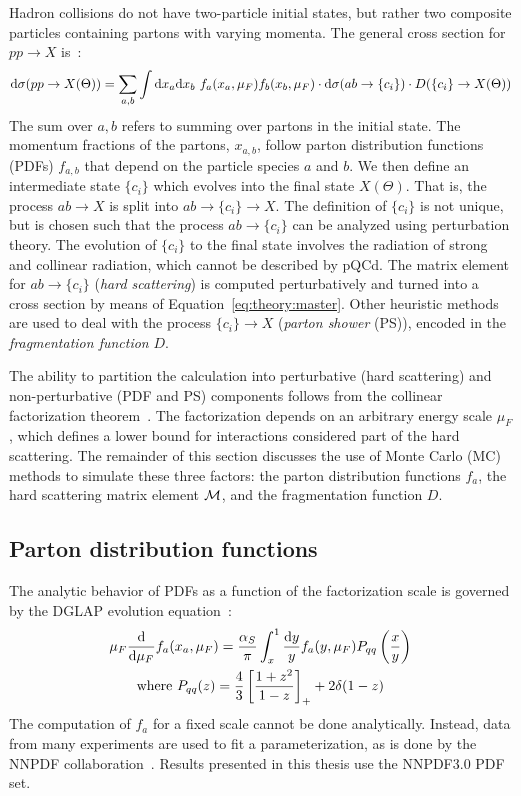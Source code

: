 Hadron collisions do not have two-particle initial states, but rather two composite particles containing partons with varying momenta. 
The general cross section for ${pp\rightarrow X}$ is~\cite{tasi009}:
\begin{equation}
\mathrm{d}\sigma(pp\rightarrow X(\Theta)) = 
    \sum_{a,b} \int \mathrm{d}x_a \mathrm{d}x_b 
    ~f_a(x_a,\mu_F) f_b(x_b,\mu_F) 
    \cdot \mathrm{d}\sigma(ab\rightarrow\{c_i\}) 
    \cdot D(\{c_i\}\rightarrow X(\Theta))
    \label{eq:theory:master}
\end{equation}
The sum over ${a,b}$ refers to summing over partons in the initial state.
The momentum fractions of the partons, ${x_{a,b}}$, follow parton distribution functions (PDFs) ${f_{a,b}}$ that depend on the particle species ${a}$ and ${b}$. 
We then define an intermediate state ${\{c_i\}}$ which evolves into the final state ${X(\Theta)}$.
That is, the process ${ab\rightarrow X}$ is split into ${ab\rightarrow \{c_i\} \rightarrow X}$.
The definition of ${\{c_i\}}$ is not unique, but is chosen such that the process ${ab\rightarrow\{c_i\}}$ can be analyzed using perturbation theory.
The evolution of ${\{c_i\}}$ to the final state involves the radiation of strong and collinear radiation, which cannot be described by pQCd.
The matrix element for ${ab\rightarrow\{c_i\}}$  (\emph{hard scattering}) is computed perturbatively and turned into a cross section by means of Equation~\ref{eq:theory:master}.
Other heuristic methods are used to deal with the process ${\{c_i\}\rightarrow X}$ (\emph{parton shower} (PS)), encoded in the \emph{fragmentation function} ${D}$. 

The ability to partition the calculation into perturbative (hard scattering) and non-perturbative (PDF and PS) components follows from the collinear factorization theorem~\cite{fact}.
The factorization depends on an arbitrary energy scale ${\mu_F}$, which defines a lower bound for interactions considered part of the hard scattering. 
The remainder of this section discusses the use of Monte Carlo (MC) methods to simulate these three factors: the parton distribution functions ${f_a}$, the hard scattering matrix element ${\mathcal{M}}$, and the fragmentation function ${D}$.

\subsection{Parton distribution functions}
The analytic behavior of PDFs as a function of the factorization scale is governed by the DGLAP evolution equation~\cite{dglap1,dglap2,dglap3}:
\begin{gather}
    \mu_F \frac{\mathrm{d}}{\mathrm{d}\mu_F} f_a(x_a,\mu_F) = \frac{\alpha_S}{\pi} \int_x^1 \frac{\mathrm{d} y}{y} f_a(y,\mu_F) P_{qq} \left(\frac{x}{y}\right) \\
    \text{where } P_{qq}(z) = \frac{4}{3}\left[\frac{1+z^2}{1-z}\right]_+ + 2\delta(1-z) \nonumber 
    \label{eq:theory:dglap}
\end{gather}
The computation of ${f_a}$ for a fixed scale cannot be done analytically.
Instead, data from many experiments are used to fit a parameterization, as is done by the NNPDF collaboration~\cite{nnpdf}.
Results presented in this thesis use the NNPDF3.0 PDF set.


